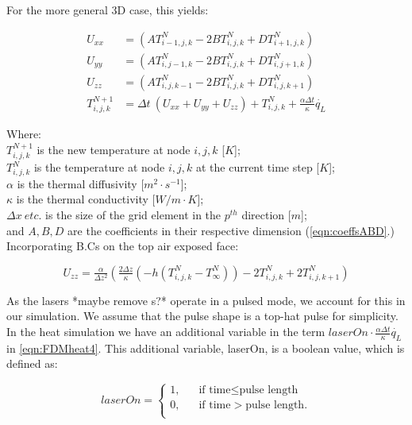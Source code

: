 For the more general 3D case, this yields:

\begin{align}
U_{xx} &=  (A T^N_{i-1,j,k} - 2B T^N_{i,j,k} + D T^N_{i+1,j,k}) \label{eqn:FDMheat1}\\
U_{yy} &=  (A T^N_{i,j-1,k} - 2B T^N_{i,j,k} + D T^N_{i,j+1,k}) \label{eqn:FDMheat2}\\
U_{zz} &=  (A T^N_{i,j,k-1} - 2B T^N_{i,j,k} + D T^N_{i,j,k+1}) \label{eqn:FDMheat3}\\
T^{N+1}_{i,j,k} &= \Delta t\ (U_{xx} + U_{yy} + U_{zz}) + T^{N}_{i,j,k} + \tfrac{\alpha \Delta t}{\kappa}\dot{q_L} \label{eqn:FDMheat4}
\end{align}

\noindent Where:\\
	\indent $T^{N+1}_{i,j,k}$ is the new temperature at node $i,j,k$ [$K$];\\
	\indent $T^N_{i,j,k}$ is the temperature at node $i,j,k$ at the current time step [$K$];\\
	\indent $\alpha$ is the thermal diffusivity [$m^2\cdot s^{-1}$];\\
	\indent $\kappa$ is the thermal conductivity [$W/m\cdot K$];\\
	\indent $\Delta x\ etc.$ is the size of the grid element in the $p^{th}$ direction [$m$];\\
	\indent and $A, B,D$ are the coefficients in their respective dimension (\cref{eqn:coeffsABD}.)\\
	
Incorporating B.Cs on the top air exposed face:

\begin{equation}
U_{zz} = \tfrac{\alpha}{\Delta z^2} (\tfrac{2 \Delta z}{\kappa} (-h(T^N_{i,j,k}-T^N_\infty) ) -2 T^N_{i,j,k} + 2T^N_{i,j,k+1}) 
\end{equation}

As the lasers *maybe remove s?* operate in a pulsed mode, we account for this in our simulation. We assume that the pulse shape is a top-hat pulse for simplicity. In the heat simulation we have an additional variable in the term $laserOn\cdot\tfrac{\alpha \Delta t}{\kappa}\dot{q_L}$ in \cref{eqn:FDMheat4}. This additional variable, laserOn, is a boolean value, which is defined as:

\[   
laserOn = 
     \begin{cases}
       \text{1,} &\quad\text{if time}\le\text{pulse length}\\
       \text{0,} &\quad\text{if time}>\text{pulse length}.\\
     \end{cases}
\]

